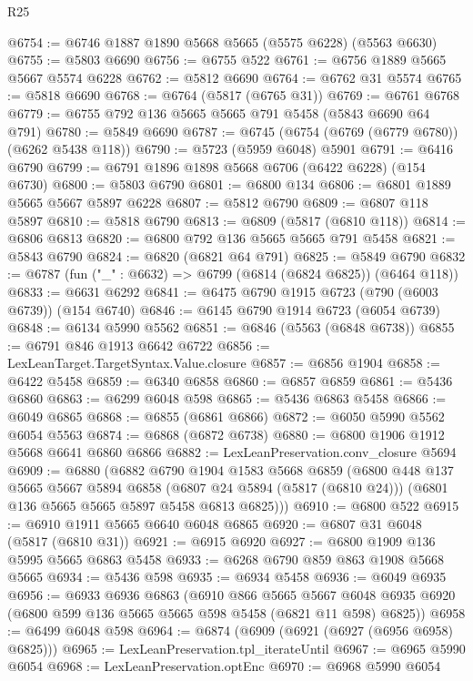 \begin{lexlean}{R25}
\begin{coremodule}
@6754 := @6746 @1887 @1890 @5668 @5665 (@5575 @6228) (@5563 @6630)
@6755 := @5803 @6690
@6756 := @6755 @522
@6761 := @6756 @1889 @5665 @5667 @5574 @6228
@6762 := @5812 @6690
@6764 := @6762 @31 @5574
@6765 := @5818 @6690
@6768 := @6764 (@5817 (@6765 @31))
@6769 := @6761 @6768
@6779 := @6755 @792 @136 @5665 @5665 @791 @5458 (@5843 @6690 @64 @791)
@6780 := @5849 @6690
@6787 := @6745 (@6754 (@6769 (@6779 @6780)) (@6262 @5438 @118))
@6790 := @5723 (@5959 @6048) @5901
@6791 := @6416 @6790
@6799 := @6791 @1896 @1898 @5668 @6706 (@6422 @6228) (@154 @6730)
@6800 := @5803 @6790
@6801 := @6800 @134
@6806 := @6801 @1889 @5665 @5667 @5897 @6228
@6807 := @5812 @6790
@6809 := @6807 @118 @5897
@6810 := @5818 @6790
@6813 := @6809 (@5817 (@6810 @118))
@6814 := @6806 @6813
@6820 := @6800 @792 @136 @5665 @5665 @791 @5458
@6821 := @5843 @6790
@6824 := @6820 (@6821 @64 @791)
@6825 := @5849 @6790
@6832 := @6787 (fun ("_" : @6632) => @6799 (@6814 (@6824 @6825)) (@6464 @118))
@6833 := @6631 @6292
@6841 := @6475 @6790 @1915 @6723 (@790 (@6003 @6739)) (@154 @6740)
@6846 := @6145 @6790 @1914 @6723 (@6054 @6739)
@6848 := @6134 @5990 @5562
@6851 := @6846 (@5563 (@6848 @6738))
@6855 := @6791 @846 @1913 @6642 @6722
@6856 := LexLeanTarget.TargetSyntax.Value.closure
@6857 := @6856 @1904
@6858 := @6422 @5458
@6859 := @6340 @6858
@6860 := @6857 @6859
@6861 := @5436 @6860
@6863 := @6299 @6048 @598
@6865 := @5436 @6863 @5458
@6866 := @6049 @6865
@6868 := @6855 (@6861 @6866)
@6872 := @6050 @5990 @5562 @6054 @5563
@6874 := @6868 (@6872 @6738)
@6880 := @6800 @1906 @1912 @5668 @6641 @6860 @6866
@6882 := LexLeanPreservation.conv_closure @5694
@6909 := @6880
    (@6882
      @6790
      @1904
      @1583
      @5668
      @6859
      (@6800
        @448
        @137
        @5665
        @5667
        @5894
        @6858
        (@6807 @24 @5894 (@5817 (@6810 @24)))
        (@6801 @136 @5665 @5665 @5897 @5458 @6813 @6825)))
@6910 := @6800 @522
@6915 := @6910 @1911 @5665 @6640 @6048 @6865
@6920 := @6807 @31 @6048 (@5817 (@6810 @31))
@6921 := @6915 @6920
@6927 := @6800 @1909 @136 @5995 @5665 @6863 @5458
@6933 := @6268 @6790 @859 @863 @1908 @5668 @5665
@6934 := @5436 @598
@6935 := @6934 @5458
@6936 := @6049 @6935
@6956 := @6933
    @6936
    @6863
    (@6910
      @866
      @5665
      @5667
      @6048
      @6935
      @6920
      (@6800 @599 @136 @5665 @5665 @598 @5458 (@6821 @11 @598) @6825))
@6958 := @6499 @6048 @598
@6964 := @6874 (@6909 (@6921 (@6927 (@6956 @6958) @6825)))
@6965 := LexLeanPreservation.tpl_iterateUntil
@6967 := @6965 @5990 @6054
@6968 := LexLeanPreservation.optEnc
@6970 := @6968 @5990 @6054

\end{coremodule}
\end{lexlean}
